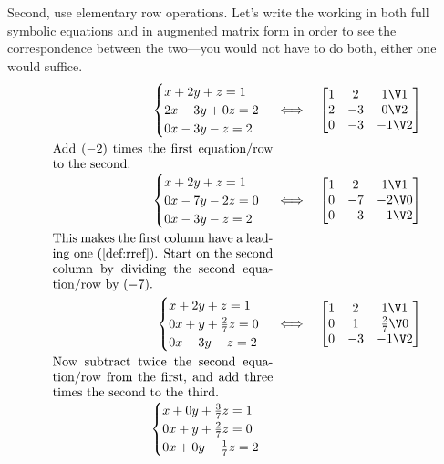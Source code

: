 \begin{example}
\begin{solution}
Second, use elementary row operations.
Let's write the working in both full symbolic equations and in augmented matrix form in order to see the correspondence between the two---you would not have to do both, either one would suffice.
\begin{eqnarray*}
\begin{cases}
x+2y+z=1\\ 2x-3y+0z=2\\ 0x-3y-z=2
\end{cases}
&\iff&%
\begin{bmatrix} 1&2&1\V1\\2&-3&0\V2\\0&-3&-1\V2 \end{bmatrix}
\\[0ex plus 1ex]
\parbox{0.5\linewidth}{Add \((-2)\) times the first equation\slash row to the second.}
\\[0ex plus 1ex]
\begin{cases}
x+2y+z=1\\ 0x-7y-2z=0\\ 0x-3y-z=2
\end{cases}
&\iff&%
\begin{bmatrix} 1&2&1\V1\\0&-7&-2\V0\\0&-3&-1\V2 \end{bmatrix}
\\[0ex plus 1ex]
\parbox{0.5\linewidth}{This makes the first column have a leading one (\autoref{def:rref}).  Start on the second column by dividing the second equation\slash row by~\((-7)\).}
\\[0ex plus 1ex]
\begin{cases}
x+2y+z=1\\ 0x+y+\frac27z=0\\ 0x-3y-z=2
\end{cases}
&\iff&%
\begin{bmatrix} 1&2&1\V1\\0&1&\frac27\V0\\0&-3&-1\V2 \end{bmatrix}
\\[0ex plus 1ex]
\parbox{0.5\linewidth}{Now subtract twice the second equation\slash row from the first, and add three times the second to the third.}
\\[0ex plus 1ex]
\begin{cases}
x+0y+\frac37z=1\\ 0x+y+\frac27z=0\\ 0x+0y-\frac17z=2

\end{cases}
\end{eqnarray*}
\end{solution}
\end{example}
